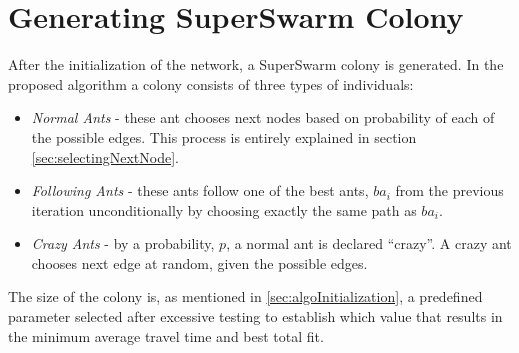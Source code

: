 \section{Generating SuperSwarm Colony}
After the initialization of the network, a SuperSwarm colony is generated. In the proposed algorithm a colony consists of three types of individuals:
\begin{itemize}
\item \textit{Normal Ants} - these ant chooses next nodes based on probability of each of the possible edges. This process is entirely explained in section \vref{sec:selectingNextNode}.
\item \textit{Following Ants} - these ants follow one of the best ants, $ba_i$ from the previous iteration unconditionally by choosing exactly the same path as $ba_i$.
\item \textit{Crazy Ants} - by a probability, $p$, a normal ant is declared ``crazy''. A crazy ant chooses next edge at random, given the possible edges.  
\end{itemize}



 The size of the colony is, as mentioned in \vref{sec:algoInitialization}, a predefined parameter selected after excessive testing to establish which value that results in the minimum average travel time and best total fit. 
